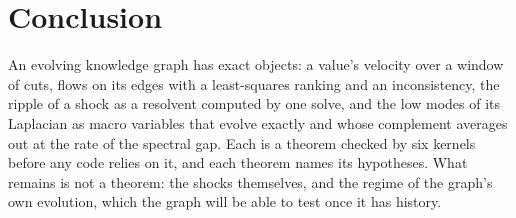 \documentclass[11pt,a4paper]{article}
\theoremstyle{plain}
\theoremstyle{definition}
\theoremstyle{remark}
\begin{document}
\section{Conclusion}

An evolving knowledge graph has exact objects: a value's velocity over a window of cuts, flows on
its edges with a least-squares ranking and an inconsistency, the ripple of a shock as a resolvent
computed by one solve, and the low modes of its Laplacian as macro variables that evolve exactly
and whose complement averages out at the rate of the spectral gap. Each is a theorem checked by
six kernels before any code relies on it, and each theorem names its hypotheses. What remains is
not a theorem: the shocks themselves, and the regime of the graph's own evolution, which the
graph will be able to test once it has history.



\end{document}

